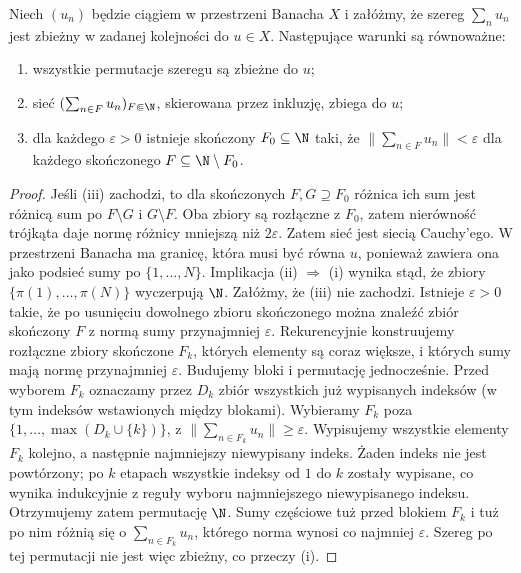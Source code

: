 \begin{lemat}
\label{lem:net-unconditional27}
Niech $(u_n)$ będzie ciągiem w przestrzeni Banacha $X$
i załóżmy, że szereg $\sum_nu_n$ jest zbieżny w zadanej
kolejności do $u\in X$. Następujące warunki są równoważne:
\begin{enumerate}[label=\textup{(\roman*)}]
\item wszystkie permutacje szeregu są zbieżne do $u$;
\item sieć $(\sum_{n\in F}u_n)_{F\Subset\N}$, skierowana przez inkluzję,
 zbiega do $u$;
\item dla każdego $\varepsilon>0$ istnieje skończony $F_0\subseteq\N$
 taki, że $\|\sum_{n\in F}u_n\|<\varepsilon$
 dla każdego skończonego $F\subseteq\N\setminus F_0$.
\end{enumerate}
\end{lemat}
\begin{proof}
Jeśli (iii) zachodzi, to dla skończonych
$F,G\supseteq F_0$ różnica ich sum jest różnicą sum po
$F\setminus G$ i $G\setminus F$. Oba zbiory są rozłączne
z $F_0$, zatem nierówność trójkąta daje normę różnicy
mniejszą niż $2\varepsilon$. Zatem sieć jest
siecią Cauchy'ego. W przestrzeni Banacha ma granicę,
która musi być równa $u$, ponieważ zawiera ona jako podsieć
sumy po $\{1,\ldots,N\}$.
Implikacja (ii) $\Rightarrow$ (i) wynika stąd, że
zbiory $\{\pi(1),\ldots,\pi(N)\}$ wyczerpują $\N$.
Załóżmy, że (iii) nie zachodzi. Istnieje $\varepsilon>0$
takie, że po usunięciu dowolnego zbioru skończonego
można znaleźć zbiór skończony $F$ z normą sumy
przynajmniej $\varepsilon$. Rekurencyjnie konstruujemy
rozłączne zbiory skończone $F_k$, których elementy są coraz
większe, i których sumy mają normę przynajmniej $\varepsilon$.
Budujemy bloki i permutację jednocześnie. Przed wyborem $F_k$
oznaczamy przez $D_k$ zbiór wszystkich już wypisanych indeksów
(w tym indeksów wstawionych między blokami). Wybieramy $F_k$
poza $\{1,\ldots,\max(D_k\cup\{k\})\}$, z
$\|\sum_{n\in F_k}u_n\|\ge\varepsilon$. Wypisujemy wszystkie
elementy $F_k$ kolejno, a następnie najmniejszy niewypisany
indeks. Żaden indeks nie jest powtórzony; po $k$ etapach
wszystkie indeksy od $1$ do $k$ zostały wypisane, co wynika
indukcyjnie z reguły wyboru najmniejszego niewypisanego indeksu.
Otrzymujemy zatem permutację $\N$.
Sumy częściowe tuż przed blokiem $F_k$ i tuż po nim
różnią się o $\sum_{n\in F_k}u_n$, którego norma wynosi
co najmniej $\varepsilon$. Szereg po tej permutacji nie jest więc
zbieżny, co przeczy (i).
\end{proof}

